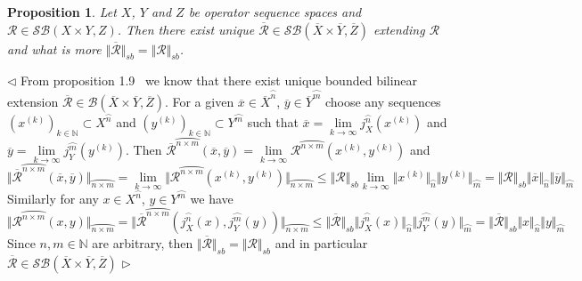 \documentclass[12pt]{article}
\newtheorem{proposition}[theorem]{Proposition}
\newenvironment{proof}{\par $\triangleleft$}{$\triangleright$}
\begin{document}
\begin{proposition}\label{PrExtBilOpByCont} Let $X$, $Y$ and $Z$ be operator 
sequence spaces and $\mathcal{R}\in\mathcal{SB}(X\times Y,Z)$. Then there exist 
unique 
$\overline{\mathcal{R}}\in
\mathcal{SB}(\overline{X}\times\overline{Y},\overline{Z})$ extending 
$\mathcal{R}$ and what is more 
$\Vert\overline{\mathcal{R}}\Vert_{sb}=\Vert\mathcal{R}\Vert_{sb}$.
\end{proposition}
\begin{proof} From proposition 1.9~\cite{DefFloTensNorOpId} we know that there 
exist unique bounded bilinear extension 
$\overline{\mathcal{R}}\in
\mathcal{B}(\overline{X}\times\overline{Y},\overline{Z})$. For a given 
$\overline{x}\in \overline{X}^{\wideparen{n}}$, 
$\overline{y}\in \overline{Y}^{\wideparen{m}}$ choose any sequences 
${(x^{(k)})}_{k\in\mathbb{N}}\subset X^{\wideparen{n}}$ and 
${(y^{(k)})}_{k\in\mathbb{N}}\subset Y^{\wideparen{m}}$ such that 
$\overline{x}=\lim\limits_{k\to\infty} j_X^{\wideparen{n}}(x^{(k)})$ and 
$\overline{y}=\lim\limits_{k\to\infty} j_Y^{\wideparen{m}}(y^{(k)})$. Then 
$\overline{\mathcal{R}}^{\wideparen{n\times m}}(\overline{x},\overline{y})
=\lim\limits_{k\to\infty}\mathcal{R}^{\wideparen{n\times m}}(x^{(k)}, y^{(k)})$ 
and
$$
\Vert\overline{\mathcal{R}}^{\wideparen{n\times
m}}(\overline{x},\overline{y})\Vert_{\wideparen{n\times m}}
=\lim\limits_{k\to\infty}\Vert \mathcal{R}^{\wideparen{n\times m}}(x^{(k)},
y^{(k)})\Vert_{\wideparen{n\times m}}
\leq\Vert\mathcal{R}\Vert_{sb}\lim\limits_{k\to\infty}\Vert
x^{(k)}\Vert_{\wideparen{n}}\Vert y^{(k)}\Vert_{\wideparen{m}}
=\Vert\mathcal{R}\Vert_{sb}\Vert\overline{x}\Vert_{\wideparen{n}}\Vert
\overline{y}\Vert_{\wideparen{m}}
$$
Similarly for any $x\in X^{\wideparen{n}}$, $y\in Y^{\wideparen{m}}$ we have
$$
\Vert\mathcal{R}^{\wideparen{n\times m}}(x,y)\Vert_{\wideparen{n\times m}}
=\Vert\overline{\mathcal{R}}^{\wideparen{n\times
m}}(j_X^{\wideparen{n}}(x),j_Y^{\wideparen{m}}(y))\Vert_{\wideparen{n\times m}}
\leq\Vert\overline{\mathcal{R}}\Vert_{sb}\Vert
j_X^{\wideparen{n}}(x)\Vert_{\wideparen{n}}\Vert
j_Y^{\wideparen{m}}(y)\Vert_{\wideparen{m}}
=\Vert\overline{\mathcal{R}}\Vert_{sb}\Vert x\Vert_{\wideparen{n}}\Vert
y\Vert_{\wideparen{m}}
$$
Since $n,m\in\mathbb{N}$ are arbitrary, then 
$\Vert\overline{\mathcal{R}}\Vert_{sb}=\Vert\mathcal{R}\Vert_{sb}$ and in 
particular 
$\overline{\mathcal{R}}
\in\mathcal{SB}(\overline{X}\times\overline{Y},\overline{Z})$
\end{proof}
\end{document}
